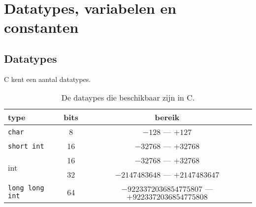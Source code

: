 \chapter{Datatypes, variabelen en constanten}
\thispagestyle{empty}

\section{Datatypes}
C kent een aantal datatypes.


\begin{table}[!ht]
\centering
\caption{De dataypes die beschikbaar zijn in C.}
\label{tab:my-table}
\begin{tabular}{@{}lcc@{}}
\toprule
\textbf{type}          & \textbf{bits} & \textbf{bereik}  \\ \midrule
\texttt{char}          & 8                       & $-128$ --- $+127$  \\
\texttt{short int}     & 16                      & $-32768$ --- $+32768$ \\
\multirow{2}{*}{int}   & 16                      & $-32768$ --- $+32768$ \\
                       & 32                      & $-2147483648$ --- $+2147483647$ \\
\texttt{long long int} & 64                      & $-9223372036854775807$ --- $+9223372036854775808$  \\
   \bottomrule
\end{tabular}
\end{table}

%
